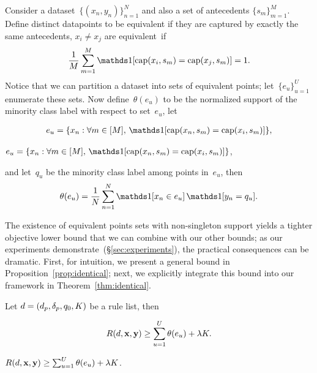 Consider a dataset~${\{(x_n, y_n)\}_{n=1}^N}$ and also a set of antecedents
${\{s_m\}_{m=1}^M}$.
%
Define distinct datapoints to be equivalent if they are captured by
exactly the same antecedents, \ie ${x_i \neq x_j}$ are equivalent~if
\begin{align}
\frac{1}{M} \sum_{m=1}^M \one [ \Cap(x_i, s_m) = \Cap(x_j, s_m) ] = 1.
\end{align}
Notice that we can partition a dataset into sets of equivalent points;
let~${\{e_u\}_{u=1}^U}$ enumerate these sets.
%
Now define~$\theta(e_u)$ to be the normalized support of the minority
class label with respect to set~$e_u$, \eg let
\begin{arxiv}
\begin{align}
{e_u = \{x_n : \forall m \in [M],\, \one [ \Cap(x_n, s_m) = \Cap(x_i, s_m) ] \}},
\end{align}
\end{arxiv}
\begin{kdd}
${e_u = \{x_n : \forall m \in [M],\, \one [ \Cap(x_n, s_m) = \Cap(x_i, s_m) ] \}}$,
\end{kdd}
and let~$q_u$ be the minority class label among points in~$e_u$, then
\begin{align}
\theta(e_u) = \frac{1}{N} \sum_{n=1}^N \one [ x_n \in e_u ]\, \one [ y_n = q_u ].
\label{eq:theta}
\end{align}

The existence of equivalent points sets with non-singleton support
yields a tighter objective lower bound that we can combine with our other bounds;
as our experiments demonstrate~(\S\ref{sec:experiments}),
the practical consequences can be dramatic.
%
First, for intuition, we present a general bound in
Proposition~\ref{prop:identical}; next, we explicitly integrate
this bound into our framework in Theorem~\ref{thm:identical}.

\begin{proposition}
\label{prop:identical}
Let ${{d} = (d_p, \delta_p, q_0, K)}$ be a rule list, then
\begin{arxiv}
\begin{align}
R({d}, \mathbf{x}, \mathbf{y}) \ge \sum_{u=1}^U \theta(e_u) + {\lambda} K.
\end{align}
\end{arxiv}
\begin{kdd}
${R({d}, \mathbf{x}, \mathbf{y}) \ge \sum_{u=1}^U \theta(e_u) + {\lambda} K}$.
\end{kdd}
\end{proposition}

